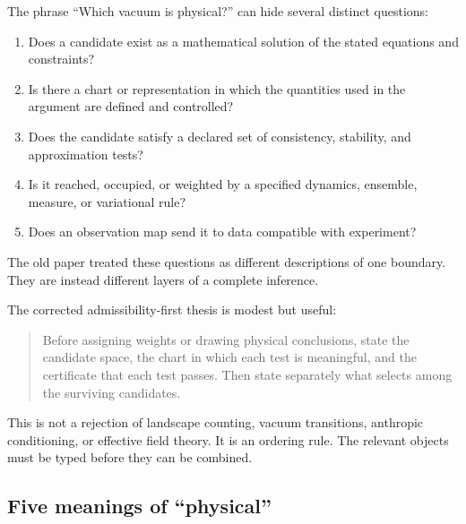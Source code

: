 \documentclass[11pt]{article}
\theoremstyle{definition}
\theoremstyle{remark}
\newcommand{\1}{\mathbf 1}
\begin{document}
The phrase ``Which vacuum is physical?'' can hide several distinct
questions:
\begin{enumerate}[leftmargin=2em]
\item Does a candidate exist as a mathematical solution of the stated
      equations and constraints?
\item Is there a chart or representation in which the quantities used in
      the argument are defined and controlled?
\item Does the candidate satisfy a declared set of consistency, stability,
      and approximation tests?
\item Is it reached, occupied, or weighted by a specified dynamics,
      ensemble, measure, or variational rule?
\item Does an observation map send it to data compatible with experiment?
\end{enumerate}
The old paper treated these questions as different descriptions of one
boundary.  They are instead different layers of a complete inference.

The corrected admissibility-first thesis is modest but useful:
\begin{quote}
Before assigning weights or drawing physical conclusions, state the
candidate space, the chart in which each test is meaningful, and the
certificate that each test passes.  Then state separately what selects
among the surviving candidates.
\end{quote}
This is not a rejection of landscape counting, vacuum transitions,
anthropic conditioning, or effective field theory.  It is an ordering rule.
The relevant objects must be typed before they can be combined.

\subsection{Five meanings of ``physical''}
\end{document}
